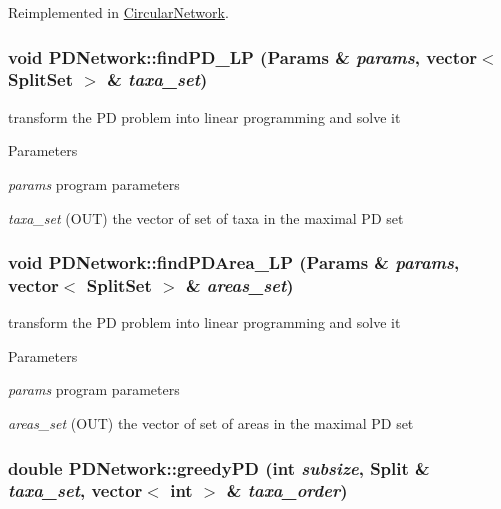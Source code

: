Reimplemented in \hyperlink{classCircularNetwork_a2d7a229ba82a87667c7f194249484f38}{CircularNetwork}.\hypertarget{classPDNetwork_aa86d84304ea9865f0a97f1329057b6ad}{
\subsubsection[{findPD\_\-LP}]{\setlength{\rightskip}{0pt plus 5cm}void PDNetwork::findPD\_\-LP ({\bf Params} \& {\em params}, \/  vector$<$ {\bf SplitSet} $>$ \& {\em taxa\_\-set})}}
\label{classPDNetwork_aa86d84304ea9865f0a97f1329057b6ad}
transform the PD problem into linear programming and solve it 
\begin{DoxyParams}{Parameters}
\item[{\em params}]program parameters \item[{\em taxa\_\-set}](OUT) the vector of set of taxa in the maximal PD set \end{DoxyParams}
\hypertarget{classPDNetwork_ab7529ca69f5a56de23aae6853276dec7}{
\subsubsection[{findPDArea\_\-LP}]{\setlength{\rightskip}{0pt plus 5cm}void PDNetwork::findPDArea\_\-LP ({\bf Params} \& {\em params}, \/  vector$<$ {\bf SplitSet} $>$ \& {\em areas\_\-set})}}
\label{classPDNetwork_ab7529ca69f5a56de23aae6853276dec7}
transform the PD problem into linear programming and solve it 
\begin{DoxyParams}{Parameters}
\item[{\em params}]program parameters \item[{\em areas\_\-set}](OUT) the vector of set of areas in the maximal PD set \end{DoxyParams}
\hypertarget{classPDNetwork_a45e8597bb2a7f8829b2560c613a10497}{
\subsubsection[{greedyPD}]{\setlength{\rightskip}{0pt plus 5cm}double PDNetwork::greedyPD (int {\em subsize}, \/  {\bf Split} \& {\em taxa\_\-set}, \/  vector$<$ int $>$ \& {\em taxa\_\-order})}}

